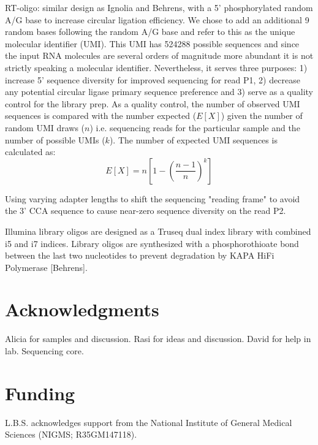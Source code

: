 \documentclass[9pt,lineno]{elife}
\begin{document}
RT-oligo: similar design as Ignolia and Behrens, with a 5' phosphorylated random A/G base to increase circular ligation efficiency.
We chose to add an additional 9 random bases following the random A/G base and refer to this as the unique molecular identifier (UMI).
This UMI has 524288 possible sequences and since the input RNA molecules are several orders of magnitude more abundant it is not strictly speaking a molecular identifier.
Nevertheless, it serves three purposes: 1) increase 5' sequence diversity for improved sequencing for read P1, 2) decrease any potential circular ligase primary sequence preference and 3) serve as a quality control for the library prep.
As a quality control, the number of observed UMI sequences is compared with the number expected ($E[X]$) given the number of random UMI draws ($n$) i.e. sequencing reads for the particular sample and the number of possible UMIs ($k$).
The number of expected UMI sequences is calculated as:
$$
E[X] = n \left[ 1 - \left(\frac{n-1}{n} \right)^k \right]
$$


Using varying adapter lengths to shift the sequencing "reading frame"  to avoid the 3' CCA sequence to cause near-zero sequence diversity on the read P2.

Illumina library oligos are designed as a Truseq dual index library with combined i5 and i7 indices.
Library oligos are synthesized with a phosphorothioate bond between the last two nucleotides to prevent degradation by KAPA HiFi Polymerase [Behrens].






\section{Acknowledgments}
Alicia for samples and discussion.
Rasi for ideas and discussion.
David for help in lab.
Sequencing core.

\section{Funding}
L.B.S. acknowledges support from the National Institute of General Medical Sciences (NIGMS; R35GM147118).



\end{document}
